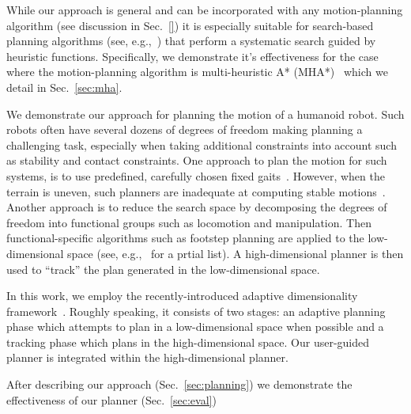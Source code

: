 \documentclass[conference]{IEEEtran}
\begin{document}
%

While our approach is general and can be incorporated with any motion-planning algorithm (see discussion in Sec.~\ref{}) it is especially suitable for search-based planning algorithms (see, e.g.,~\cite{CCL14}) that perform a systematic search guided by heuristic functions.
Specifically, we demonstrate it's effectiveness for the case where the motion-planning algorithm is multi-heuristic A* (MHA*)~\cite{ASNHL16, NAL15} which we detail in Sec.~\ref{sec:mha}.


We demonstrate our approach for planning the motion of a humanoid robot. Such robots often have several dozens of degrees of freedom making planning a challenging task, especially when taking additional constraints into account such as stability and contact constraints.
One approach to plan the motion for such systems, is to use predefined, carefully chosen fixed gaits~\cite{KKKHKHAI04}. 
However, when the terrain is uneven, such planners are inadequate at computing stable motions~\cite{HBLHW08}.
Another approach is to reduce the search space by decomposing the degrees of freedom into functional groups such as locomotion and manipulation.
Then functional-specific algorithms such as footstep planning are applied to the low-dimensional space (see, e.g.,~\cite{CLCKHK05, KNKII01, PSBLY12, XCXZC09, KKNII02} for a prtial list).
A high-dimensional planner is then used to ``track'' the plan generated in the low-dimensional space.

In this work, we employ the recently-introduced adaptive dimensionality framework~\cite{GCBSL11, GSL12, GSL13}.
Roughly speaking,  it consists of two stages: an adaptive planning phase which attempts to plan in a low-dimensional space when possible and a tracking phase which plans in the high-dimensional space.
Our user-guided planner is integrated within the high-dimensional planner.

After describing our approach (Sec.~\ref{sec:planning}) we demonstrate the effectiveness of our planner (Sec.~\ref{sec:eval})
\end{document}
